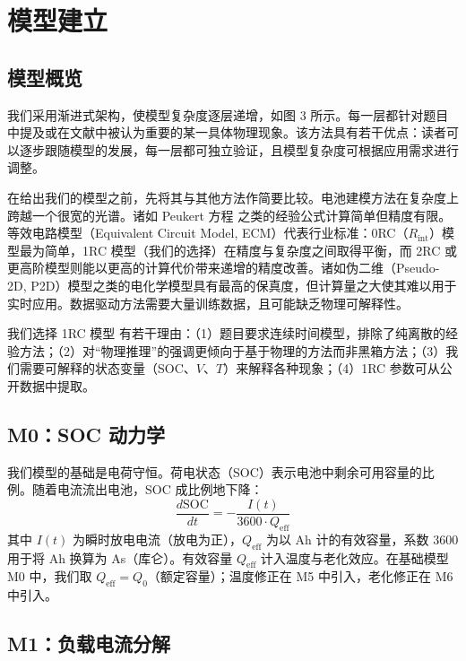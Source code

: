\documentclass[11pt,a4paper]{ctexart}
\begin{document}
\section{模型建立}

\subsection{模型概览}

我们采用渐进式架构，使模型复杂度逐层递增，如图 3 所示。每一层都针对题目中提及或在文献中被认为重要的某一具体物理现象。该方法具有若干优点：读者可以逐步跟随模型的发展，每一层都可独立验证，且模型复杂度可根据应用需求进行调整。

在给出我们的模型之前，先将其与其他方法作简要比较。电池建模方法在复杂度上跨越一个很宽的光谱。诸如 Peukert 方程 \cite{ref14} 之类的经验公式计算简单但精度有限。等效电路模型（Equivalent Circuit Model, ECM）代表行业标准：0RC（$R_{\mathrm{int}}$）模型最为简单，1RC 模型（我们的选择）在精度与复杂度之间取得平衡，而 2RC 或更高阶模型则能以更高的计算代价带来递增的精度改善。诸如伪二维（Pseudo-2D, P2D）模型之类的电化学模型具有最高的保真度，但计算量之大使其难以用于实时应用。数据驱动方法需要大量训练数据，且可能缺乏物理可解释性。

我们选择 1RC 模型 \cite{ref12,ref13} 有若干理由：（1）题目要求连续时间模型，排除了纯离散的经验方法；（2）对“物理推理”的强调更倾向于基于物理的方法而非黑箱方法；（3）我们需要可解释的状态变量（SOC、$V$、$T$）来解释各种现象；（4）1RC 参数可从公开数据中提取。

\subsection{M0：SOC 动力学}

我们模型的基础是电荷守恒。荷电状态（SOC）表示电池中剩余可用容量的比例。随着电流流出电池，SOC 成比例地下降：
\begin{equation}
\frac{d\mathrm{SOC}}{dt} = -\frac{I(t)}{3600\cdot Q_{\mathrm{eff}}}
\end{equation}
其中 $I(t)$ 为瞬时放电电流（放电为正），$Q_{\mathrm{eff}}$ 为以 Ah 计的有效容量，系数 3600 用于将 Ah 换算为 As（库仑）。有效容量 $Q_{\mathrm{eff}}$ 计入温度与老化效应。在基础模型 M0 中，我们取 $Q_{\mathrm{eff}} = Q_0$（额定容量）；温度修正在 M5 中引入，老化修正在 M6 中引入。

\subsection{M1：负载电流分解}
\end{document}
